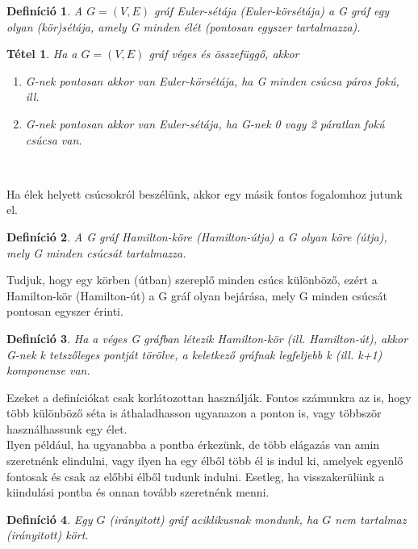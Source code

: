 \documentclass[12pt]{article}
\newtheorem{defin}{Definíció}[section]
\newtheorem{tetel}{Tétel}[section]
\begin{document}
\begin{defin}
A $G = (V,E)$ gráf Euler-sétája (Euler-körsétája) a G gráf egy olyan (kör)sétája, amely G minden élét (pontosan egyszer tartalmazza). ~\cite{szam:Fleiner}
\end{defin}

\begin{tetel}
Ha a $G = (V,E)$ gráf véges és összefüggő, akkor 
\begin{enumerate}
\item G-nek pontosan akkor van Euler-körsétája, ha G minden csúcsa páros fokú, ill.
\item G-nek pontosan akkor van Euler-sétája, ha G-nek 0 vagy 2 páratlan fokú csúcsa van.
\end{enumerate} ~\cite{szam:Fleiner}
\end{tetel}

Ha élek helyett csúcsokról beszélünk, akkor egy másik fontos fogalomhoz jutunk el.\\

\begin{defin}
A G gráf Hamilton-köre (Hamilton-útja) a G olyan köre (útja), mely G minden csúcsát tartalmazza. ~\cite{szam:Fleiner}
\end{defin}

Tudjuk, hogy egy körben (útban) szereplő minden csúcs különböző, ezért a Hamilton-kör (Hamilton-út) a G gráf olyan bejárása, mely G minden csúcsát pontosan egyszer érinti.\\

\begin{defin}
Ha a véges G gráfban létezik Hamilton-kör (ill. Hamilton-út), akkor G-nek k tetszőleges pontját törölve, a keletkező gráfnak legfeljebb k (ill. k+1) komponense van. ~\cite{szam:Fleiner}
\end{defin}

Ezeket a definíciókat csak korlátozottan használják. Fontos számunkra az is, hogy több különböző séta is áthaladhasson ugyanazon a ponton is, vagy többször használhassunk egy élet.\\
Ilyen például, ha ugyanabba a pontba érkezünk, de több elágazás van amin szeretnénk elindulni, vagy ilyen ha egy élből több él is indul ki, amelyek egyenlő fontosak és csak az előbbi élből tudunk indulni. Esetleg, ha visszakerülünk a kiindulási pontba és onnan tovább szeretnénk menni.\\

\begin{defin}
Egy $G$ (irányitott) gráf aciklikusnak mondunk, ha $G$ nem tartalmaz (irányitott) kört. ~\cite{szam:Fleiner}
\end{defin}
\end{document}
